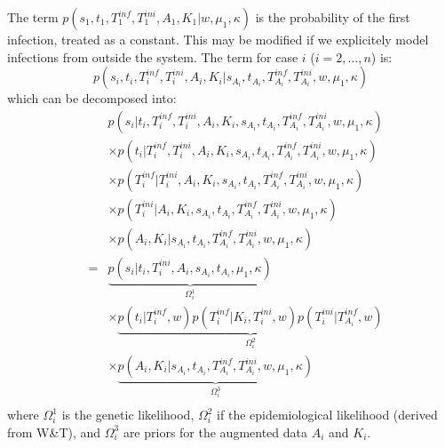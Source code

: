 \documentclass[10pt]{article}
\begin{document}
The term $p(s_1, t_1, T_1^{inf}, T_1^{ini}, A_1, K_1 | w, \mu_1, \kappa)$ is the probability of the first infection, treated as a constant.
This may be modified if we explicitely model infections from outside the system.
The term for case $i$ ($i=2,\ldots,n$) is:
\begin{equation}
 p(s_i, t_i, T_i^{inf},T_i^{ini}, A_i, K_i| s_{A_i}, t_{A_i}, T_{A_i}^{inf}, T_{A_i}^{ini}, w, \mu_1, \kappa )
\end{equation}
which can be decomposed into:
\begin{eqnarray}
& & p(s_i | t_i, T_i^{inf}, T_i^{ini}, A_i, K_i, s_{A_i}, t_{A_i}, T_{A_i}^{inf}, T_{A_i}^{ini}, w, \mu_1, \kappa) \nonumber \\
& &  \times  p(t_i | T_i^{inf}, T_i^{ini}, A_i, K_i, s_{A_i}, t_{A_i}, T_{A_i}^{inf}, T_{A_i}^{ini}, w, \mu_1, \kappa) \nonumber \\
& & \times  p(T_i^{inf}| T_i^{ini}, A_i, K_i, s_{A_i}, t_{A_i}, T_{A_i}^{inf}, T_{A_i}^{ini}, w, \mu_1, \kappa) \nonumber \\
& & \times  p(T_i^{ini}| A_i, K_i, s_{A_i}, t_{A_i}, T_{A_i}^{inf}, T_{A_i}^{ini}, w, \mu_1, \kappa) \nonumber \\
& & \times  p(A_i, K_i| s_{A_i}, t_{A_i}, T_{A_i}^{inf}, T_{A_i}^{ini}, w, \mu_1, \kappa) \nonumber \\
& = & 
\underbrace{p(s_i | t_i, T_i^{ini}, A_i, s_{A_i}, t_{A_i}, \mu_1, \kappa)}_{\Omega_i^1} \nonumber \\
& &  \times  \underbrace{p(t_i | T_i^{inf}, w) 
 p(T_i^{inf}| K_i, T_i^{ini}, w)
 p(T_i^{ini}| T_{A_i}^{inf}, w)}_{\Omega_i^2} \nonumber \\
& & \times  \underbrace{p(A_i, K_i| s_{A_i}, t_{A_i}, T_{A_i}^{inf}, T_{A_i}^{ini}, w, \mu_1, \kappa)}_{\Omega_i^3}\nonumber \\
\end{eqnarray}
\noindent where $\Omega_i^1$ is the genetic likelihood, $\Omega_i^2$ if the epidemiological likelihood (derived from W\&T), and $\Omega_i^3$ are priors for the augmented data $A_i$ and $K_i$.
\\
\end{document}
